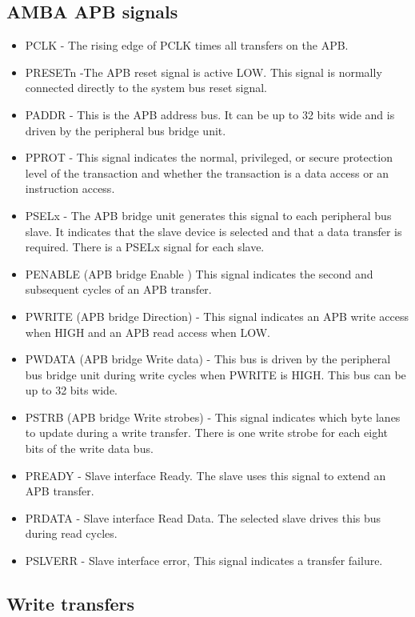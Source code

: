 \documentclass[12pt,a4paper]{report}
\begin{document}
\subsection{AMBA APB signals}

\begin{itemize}

\item	PCLK     - The rising edge of PCLK times all transfers on the APB.
\item	PRESETn    -The APB reset signal is active LOW. This signal is normally connected directly to the system bus reset signal.
\item	PADDR   -    This is the APB address bus. It can be up to 32 bits wide and is driven by the peripheral bus bridge unit.
\item	PPROT    -   This signal indicates the normal, privileged, or secure protection level of the transaction and whether the transaction is a data access or an instruction access.
\item	PSELx    -   The APB bridge unit generates this signal to each peripheral bus slave. It indicates that the slave device is selected and that a data transfer is required. There is a PSELx signal for each slave.
\item	PENABLE  (APB bridge Enable ) This signal indicates the second and subsequent cycles of an APB transfer.
\item	PWRITE  (APB bridge Direction) - This signal indicates an APB write access when HIGH and an APB read access when LOW.
\item	PWDATA (APB bridge Write data) - This bus is driven by the peripheral bus bridge unit  during     write  cycles when PWRITE is HIGH. This bus can be up to 32 bits wide.
\item	PSTRB  (APB bridge Write strobes)  - This signal indicates which byte lanes to update during a write transfer. There is one write strobe for each eight bits of the write data bus.
\item	PREADY   -  Slave interface Ready. The slave uses this signal to extend an APB transfer.
\item	PRDATA   -  Slave interface Read Data. The selected slave drives this bus during read cycles.
\item	PSLVERR  -  Slave interface error, This signal indicates a transfer failure.


\end{itemize}


\subsection{Write transfers}
\end{document}
